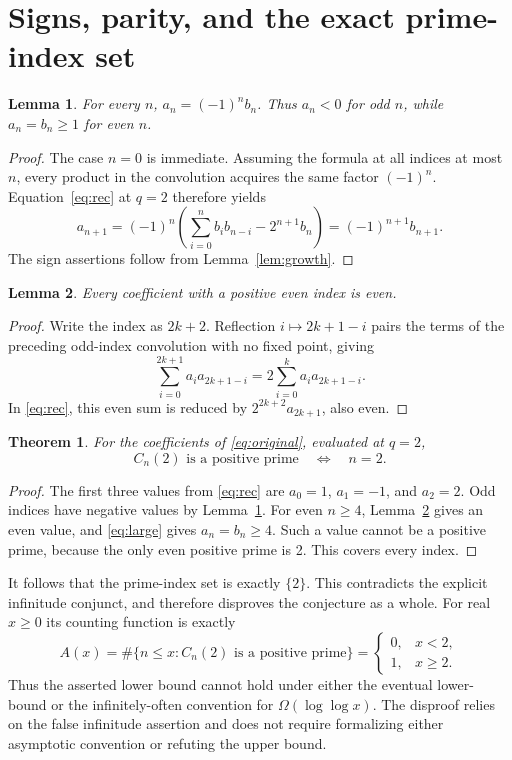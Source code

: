 \documentclass[11pt]{article}
\newtheorem{theorem}{Theorem}
\newtheorem{lemma}{Lemma}
\begin{document}
\newpage
\section{Signs, parity, and the exact prime-index set}
\begin{lemma}\label{lem:sign}
For every $n$, $a_n=(-1)^n b_n$. Thus $a_n<0$ for odd $n$, while
$a_n=b_n\ge1$ for even $n$.
\end{lemma}
\begin{proof}
The case $n=0$ is immediate. Assuming the formula at all indices at most
$n$, every product in the convolution acquires the same factor $(-1)^n$.
Equation~\eqref{eq:rec} at $q=2$ therefore yields
\[
 a_{n+1}=(-1)^n\left(\sum_{i=0}^n b_i b_{n-i}-2^{n+1}b_n\right)
 =(-1)^{n+1}b_{n+1}.
\]
The sign assertions follow from Lemma~\ref{lem:growth}.
\end{proof}

\begin{lemma}\label{lem:even}
Every coefficient with a positive even index is even.
\end{lemma}
\begin{proof}
Write the index as $2k+2$. Reflection $i\mapsto2k+1-i$ pairs the terms
of the preceding odd-index convolution with no fixed point, giving
\[
 \sum_{i=0}^{2k+1}a_i a_{2k+1-i}
 =2\sum_{i=0}^{k}a_i a_{2k+1-i}.
\]
In \eqref{eq:rec}, this even sum is reduced by
$2^{2k+2}a_{2k+1}$, also even.
\end{proof}

\begin{theorem}
For the coefficients of \eqref{eq:original}, evaluated at $q=2$,
\[
 C_n(2)\text{ is a positive prime}\quad\Longleftrightarrow\quad n=2.
\]
\end{theorem}
\begin{proof}
The first three values from \eqref{eq:rec} are $a_0=1$, $a_1=-1$,
and $a_2=2$. Odd indices have negative values by Lemma~\ref{lem:sign}.
For even $n\ge4$, Lemma~\ref{lem:even} gives an even value, and
\eqref{eq:large} gives $a_n=b_n\ge4$. Such a value cannot be a positive
prime, because the only even positive prime is 2. This covers every index.
\end{proof}

It follows that the prime-index set is exactly $\{2\}$. This contradicts
the explicit infinitude conjunct, and therefore disproves the conjecture
as a whole. For real $x\ge0$ its counting function is exactly
\[
 A(x)=\#\{n\le x:C_n(2)\text{ is a positive prime}\}
 =\begin{cases}0,&x<2,\\1,&x\ge2.\end{cases}
\]
Thus the asserted lower bound cannot hold under either the eventual
lower-bound or the infinitely-often convention for $\Omega(\log\log x)$.
The disproof relies on the false infinitude assertion and does not require
formalizing either asymptotic convention or refuting the upper bound.
\end{document}
